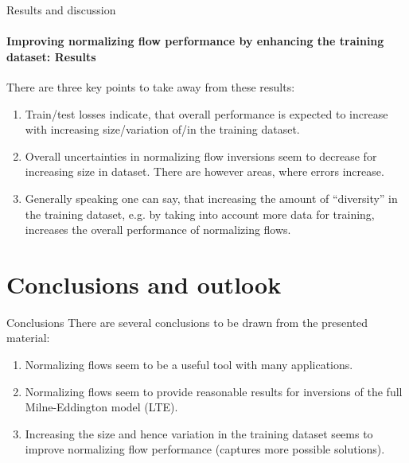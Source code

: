 \documentclass{beamer}
\begin{document}
\begin{frame}[allowframebreaks]{Results and discussion}
	\framesubtitle{Improving normalizing flow performance by enhancing the training dataset: Results} %
There are three key points to take away from these results:
\begin{enumerate}
	\item Train/test losses indicate, that overall performance is expected to increase with increasing size/variation of/in the training dataset.
	\item Overall uncertainties in normalizing flow inversions seem to decrease for increasing size in dataset. There are however areas, where errors increase.
	\item Generally speaking one can say, that increasing the amount of ``diversity'' in the training dataset, e.g. by taking into account more data for training, increases the overall performance of normalizing flows.
\end{enumerate}
\end{frame}

\section{Conclusions and outlook}
\begin{frame}[allowframebreaks]{Conclusions}
There are several conclusions to be drawn from the presented material:
\begin{enumerate}
\item Normalizing flows seem to be a useful tool with many applications.
\item Normalizing flows seem to provide reasonable results for inversions of the full Milne-Eddington model (LTE).
\item Increasing the size and hence variation in the training dataset seems to improve normalizing flow performance (captures more possible solutions).
\end{enumerate}%
\end{frame}
\end{document}

